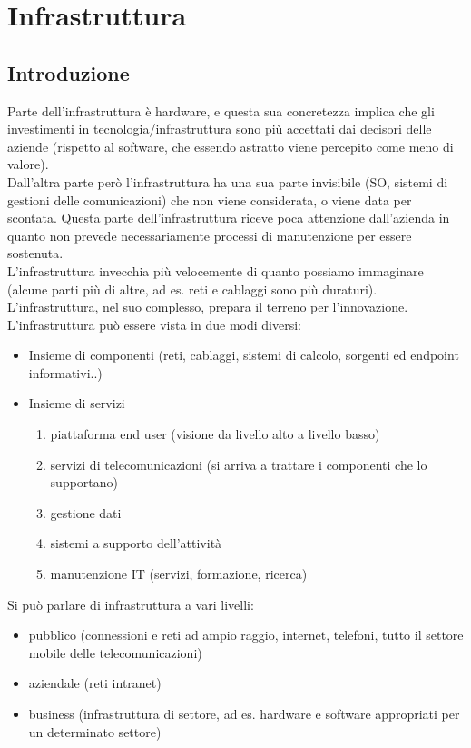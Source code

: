 \chapter{Infrastruttura}
\section{Introduzione}
Parte dell'infrastruttura \`e hardware, e questa sua concretezza implica che gli investimenti in tecnologia/infrastruttura sono pi\`u accettati dai decisori delle aziende (rispetto al software, che essendo astratto viene percepito come meno di valore).\\
Dall'altra parte per\`o l'infrastruttura ha una sua parte invisibile (SO, sistemi di gestioni delle comunicazioni) che non viene considerata, o viene data per scontata. Questa parte dell'infrastruttura riceve poca attenzione dall'azienda in quanto non prevede necessariamente processi di manutenzione per essere sostenuta.\\
L'infrastruttura invecchia pi\`u velocemente di quanto possiamo immaginare (alcune parti pi\`u di altre, ad es. reti e cablaggi sono pi\`u duraturi).
L'infrastruttura, nel suo complesso, prepara il terreno per l'innovazione.
L'infrastruttura pu\`o essere vista in due modi diversi:
\begin{itemize}
\item Insieme di componenti (reti, cablaggi, sistemi di calcolo, sorgenti ed endpoint informativi..)
\item Insieme di servizi
  \begin{enumerate}
\item piattaforma end user (visione da livello alto a livello basso)
\item servizi di telecomunicazioni (si arriva a trattare i componenti che lo supportano)
\item gestione dati
\item sistemi a supporto dell'attivit\`a
\item manutenzione IT (servizi, formazione, ricerca)
\end{enumerate}
\end{itemize}

Si pu\`o parlare di infrastruttura a vari livelli:
\begin{itemize}
\item pubblico (connessioni e reti ad ampio raggio, internet, telefoni, tutto il settore mobile delle telecomunicazioni)
\item aziendale (reti intranet)
\item business (infrastruttura di settore, ad es. hardware e software appropriati per un determinato settore)
\end{itemize}


